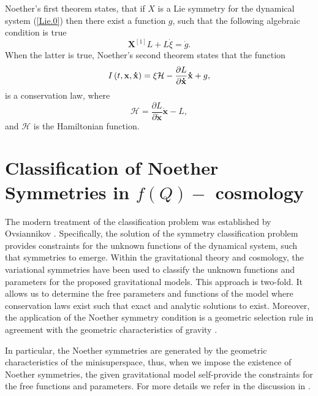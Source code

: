 \documentclass[onecolumn,superscriptaddress,secnumarabic,nobibnotes,aps,prd,nofootinbib,altaffilletter,11pt]{revtex4}
\begin{document}
Noether's first theorem states, that if $X$ is a Lie symmetry for the
dynamical system (\ref{Lie.0}) then there exist a function $g$, such that
the following algebraic condition is true \cite{noe2}%
\begin{equation}
\mathbf{X}^{\left[ 1\right] }L+L\dot{\xi}=\dot{g}.  \label{ns.01}
\end{equation}%
When the latter is true, Noether's second theorem states that the function 
\begin{equation}
I\left( t,\mathbf{x,\dot{x}}\right) =\xi \mathcal{H}-\frac{\partial L}{%
\partial \mathbf{\dot{x}}}\mathbf{\dot{x}}+g,  \label{ns.02}
\end{equation}%
is a conservation law, where 
\begin{equation}
\mathcal{H}=\frac{\partial L}{\partial \mathbf{\dot{x}}}\mathbf{\dot{x}}-L,
\end{equation}%
and $\mathcal{H}$ is the Hamiltonian function.

\section{Classification of Noether Symmetries in $f\left( Q\right) -$%
cosmology}

\label{sec4}

The modern treatment of the classification problem was established by Ovsiannikov \cite{ovsi}.
Specifically, the solution of the symmetry classification problem provides
constraints for the unknown functions of the dynamical system, such that
symmetries to emerge. Within the gravitational theory and cosmology, the variational symmetries
have been used to classify the unknown functions and parameters for the
proposed gravitational models. This approach is two-fold. It allows us to
determine the free parameters and functions of the model where conservation
laws exist such that exact and analytic solutions to exist. Moreover, the
application of the Noether symmetry condition is a geometric selection rule
in agreement with the geometric characteristics of gravity \cite{anb2}.

In particular, the Noether symmetries are generated by the geometric
characteristics of the minisuperspace, thus, when we impose the existence of
Noether symmetries, the given gravitational model self-provide the
constraints for the free functions and parameters. For more details we refer
in the discussion in \cite{anb2}.
\end{document}
